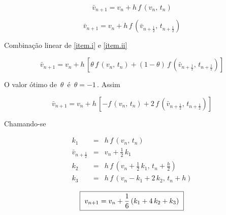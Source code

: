 \begin{enumerar}


\item
\label{item.i}

\begin{equation}
 \label{cap6:sec3:eq18}
 \bar{v}_{n+1} = v_n + h \, f \, (v_n, \, t_n)
\end{equation}

\item
\label{item.ii}

\begin{equation}
 \label{cap6:sec3:eq19}
 \bar{v}_{n+1} = v_n + h \, f \, (\bar{v}_{n+\frac{1}{2}}, \, t_{n+\frac{1}{2}})
\end{equation}

\item Combinação linear de \ref{item.i} e \ref{item.ii}

\begin{equation}
 \label{cap6:sec3:eq20}
 \bar{v}_{n+1} = v_n + h \, [\theta \, f \, (v_n, \, t_n) + (1 - \theta) \, f \, (\bar{v}_{n+\frac{1}{2}}, \, t_{n+\frac{1}{2}})]
\end{equation}

O valor ótimo de $ \, \theta \, $ é $ \, \theta = -1 \, $. Assim

\begin{equation}
 \label{cap6:sec3:eq21}
 \bar{v}_{n+1} = v_n + h \, [-f \, (v_n, \, t_n) + 2 \, f \, (\bar{v}_{n+\frac{1}{2}}, \, t_{n+\frac{1}{2}})]
\end{equation}

\end{enumerar}

Chamando-se

\begin{eqnarray}
 \label{cap6:sec3:eq22}
 k_1 & = & h \, f \, (v_n, \, t_n) \\
 \label{cap6:sec3:eq23}
 \bar{v}_{n+\frac{1}{2}} & = & v_n + \frac{1}{2} \, k_1 \\
 \label{cap6:sec3:eq24}
 k_2 & = & h \, f \, (v_n + \frac{1}{2} \, k_1, \, t_n + \frac{h}{2}) \\
 \label{cap6:sec3:eq25}
 k_3 & = & h \, f \, (v_n - k_1 + 2 \, k_2, \, t_n + h)
\end{eqnarray}

\begin{equation}
 \label{cap6:sec3:eq26}
 \mbox{ \framebox{ $ v_{n+1} = v_n + \displaystyle \frac{1}{6} \, (k_1 + 4 \, k_2 + k_3) $ } }
\end{equation}


